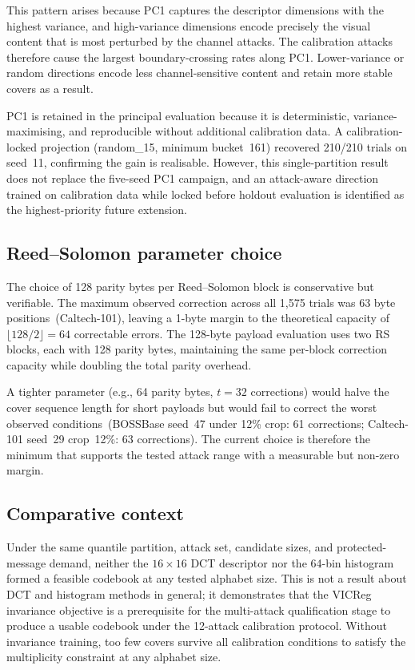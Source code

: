 ﻿\documentclass[10pt,journal]{IEEEtran}
\begin{document}
This pattern arises because PC1 captures the descriptor dimensions
with the highest variance, and high-variance dimensions encode
precisely the visual content that is most perturbed by the channel
attacks. The calibration attacks therefore cause the largest
boundary-crossing rates along PC1. Lower-variance or random
directions encode less channel-sensitive content and retain more
stable covers as a result.

PC1 is retained in the principal evaluation because it is
deterministic, variance-maximising, and reproducible without
additional calibration data. A calibration-locked projection
(random\_15, minimum bucket~161) recovered 210/210 trials on seed~11,
confirming the gain is realisable. However, this single-partition
result does not replace the five-seed PC1 campaign, and an attack-aware
direction trained on calibration data while locked before holdout
evaluation is identified as the highest-priority future extension.

\subsection{Reed--Solomon parameter choice}
\label{subsec:rs}

The choice of 128 parity bytes per Reed--Solomon block is conservative
but verifiable. The maximum observed correction across all 1{,}575
trials was 63 byte positions~(Caltech-101), leaving a 1-byte margin
to the theoretical capacity of $\lfloor 128/2\rfloor{=}64$
correctable errors. The 128-byte payload evaluation uses two RS blocks,
each with 128 parity bytes, maintaining the same per-block correction
capacity while doubling the total parity overhead.

A tighter parameter (e.g., 64 parity bytes, $t{=}32$ corrections)
would halve the cover sequence length for short payloads but would
fail to correct the worst observed conditions~(BOSSBase seed~47 under
12\% crop: 61 corrections; Caltech-101 seed~29 crop~12\%: 63
corrections). The current choice is therefore the minimum that supports
the tested attack range with a measurable but non-zero margin.

\subsection{Comparative context}

Under the same quantile partition, attack set, candidate sizes, and
protected-message demand, neither the $16\times16$ DCT descriptor nor
the 64-bin histogram formed a feasible codebook at any tested alphabet
size. This is not a result about DCT and histogram methods in general;
it demonstrates that the VICReg invariance objective is a prerequisite
for the multi-attack qualification stage to produce a usable codebook
under the 12-attack calibration protocol. Without invariance training,
too few covers survive all calibration conditions to satisfy the
multiplicity constraint at any alphabet size.
\end{document}
